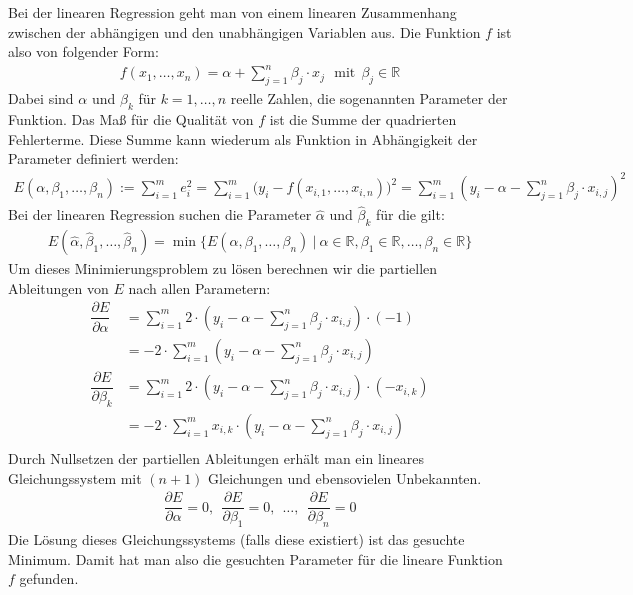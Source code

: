 Bei der linearen Regression geht man von einem linearen Zusammenhang zwischen der abhängigen und den unabhängigen Variablen aus. Die Funktion $f$ ist also von folgender Form:
\begin{align*}
    f(x_1, \dots, x_n) = \alpha + \sum_{j=1}^n \beta_j \cdot x_j ~~~ \text{mit} ~~ \beta_j \in \mathbb{R}
\end{align*}
Dabei sind $\alpha$ und $\beta_k$ für $k = 1, \dots, n$ reelle Zahlen, die sogenannten Parameter der Funktion. Das Maß für die Qualität von $f$ ist die Summe der quadrierten Fehlerterme. Diese Summe kann wiederum als Funktion in Abhängigkeit der Parameter definiert werden:
\begin{align*}
    E \left( \alpha, \beta_1, \dots, \beta_n \right) := \sum_{i=1}^m e_i^2 =  \sum_{i=1}^m \big( y_i - f(x_{i, 1}, \dots, x_{i, n}) \big)^2 = \sum_{i=1}^m \left( y_i - \alpha - \sum_{j=1}^n \beta_j \cdot x_{i, j} \right)^2
\end{align*}
Bei der linearen Regression suchen die Parameter $\hat\alpha$ und $\hat\beta_k$ für die gilt:
\begin{align*}
    E \left( \hat\alpha, \hat\beta_1, \dots, \hat\beta_n \right) = \min \big\{E(\alpha, \beta_1, \dots, \beta_n) ~\big|~ \alpha \in \mathbb{R}, \beta_1 \in \mathbb{R}, \dots, \beta_n \in \mathbb{R} \big\}
\end{align*}
Um dieses Minimierungsproblem zu lösen berechnen wir die partiellen Ableitungen von $E$ nach allen Parametern:
\begin{align*}
    \dfrac{\partial E}{\partial \alpha} &= \sum_{i=1}^m 2 \cdot \left( y_i - \alpha - \sum_{j=1}^n \beta_j \cdot x_{i, j} \right) \cdot (- 1) \\
    &= - 2 \cdot \sum_{i=1}^m \left( y_i - \alpha - \sum_{j=1}^n \beta_j \cdot x_{i, j} \right) \\
    \dfrac{\partial E}{\partial \beta_k} &= \sum_{i=1}^m 2 \cdot \left( y_i - \alpha - \sum_{j=1}^n \beta_j \cdot x_{i, j} \right) \cdot (- x_{i, k}) \\
    &= - 2 \cdot \sum_{i=1}^m x_{i, k} \cdot \left( y_i - \alpha - \sum_{j=1}^n \beta_j \cdot x_{i, j} \right) \\
\end{align*}
Durch Nullsetzen der partiellen Ableitungen erhält man ein lineares Gleichungssystem mit $(n + 1)$ Gleichungen und ebensovielen Unbekannten.
\begin{align*}
    \dfrac{\partial E}{\partial \alpha} = 0, ~~ \dfrac{\partial E}{\partial \beta_1} = 0, ~~ \dots, ~~ \dfrac{\partial E}{\partial \beta_n} = 0
\end{align*}
Die Lösung dieses Gleichungssystems (falls diese existiert) ist das gesuchte Minimum. Damit hat man also die gesuchten Parameter für die lineare Funktion $f$ gefunden.

